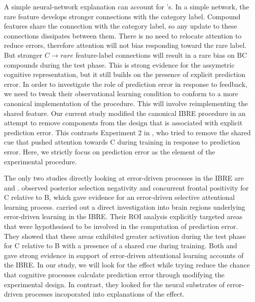 \documentclass[10pt,letterpaper]{article}
\begin{document}
A simple neural-network explanation can account for 's.
In a simple network, the rare feature develops stronger connections with the category label.
Compound features share the connection with the category label, so any update to these connections dissipates between them.
There is no need to relocate attention to reduce errors, therefore attention will not bias responding toward the rare label.
But stronger $C \to rare$ feature-label connections will result in a rare bias on BC compounds during the test phase.
This is strong evidence for the assymetric cognitive representation, but it still builds on the presence of explicit prediction error.
In order to investigate the role of prediction error in response to feedback, we need to tweak their observational learning condition to conform to a more canonical implementation of the procedure.
This will involve reimplementing the shared feature.
Our current study modified the canonical IBRE procedure in an attempt to remove components from the design that is associated with explicit prediction error.
This contrasts Experiment 2 in , who tried to remove the shared cue that pushed attention towards C during training in response to prediction error.
Here, we strictly focus on prediction error as the element of the experimental procedure.

The only two studies directly looking at error-driven processes in the IBRE are  and .
 observed posterior selection negativity and concurrent frontal positivity for C relative to B, which gave evidence for an error-driven selective attentional learning process.
 carried out a direct investigation into brain regions underlying error-driven learning in the IBRE.
Their ROI analysis explicitly targeted areas that were hypothesised to be involved in the computation of prediction error.
They showed that these areas exhibited greater activation during the test phase for C relative to B with a presence of a shared cue during training.
Both  and  gave strong evidence in support of error-driven attentional learning accounts of the IBRE.
In our study, we will look for the effect while trying reduce the chance that cognitive processes calculate prediction error through modifying the experimental design.
In contrast, they looked for the neural substrates of error-driven processes incoporated into explanations of the effect.
\end{document}
